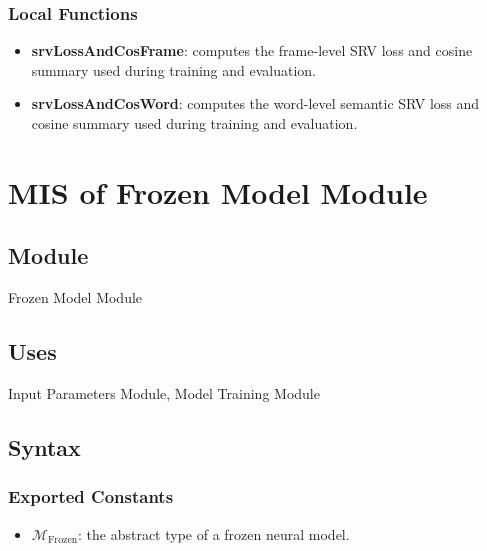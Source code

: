 \documentclass[12pt, titlepage]{article}
\begin{document}
\subsubsection{Local Functions}

\begin{itemize}
    \item \textbf{srvLossAndCosFrame}: computes the frame-level SRV loss and cosine summary used during training and evaluation.
    \item \textbf{srvLossAndCosWord}: computes the word-level semantic SRV loss and cosine summary used during training and evaluation.
\end{itemize}












\newpage





\section{MIS of Frozen Model Module} \label{Module_FrozenModel}

\subsection{Module}

Frozen Model Module

\subsection{Uses}

Input Parameters Module, Model Training Module

\subsection{Syntax}

\subsubsection{Exported Constants}

\begin{itemize}
    \item $\mathcal{M}_{\mathrm{Frozen}}$: the abstract type of a frozen neural model.
\end{itemize}
\end{document}
